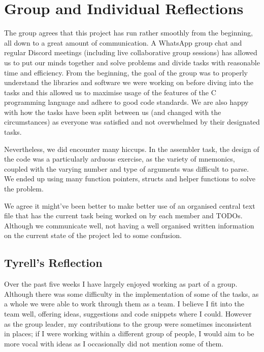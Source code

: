 \documentclass{article}
\begin{document}
\section{Group and Individual Reflections}
The group agrees that this project has run rather smoothly from the beginning, all down to a great amount of communication. A WhatsApp group chat and regular Discord meetings (including live collaborative group sessions) has allowed us to put our minds together and solve problems and divide tasks with reasonable time and efficiency. From the beginning, the goal of the group was to properly understand the libraries and software we were working on before diving into the tasks and this allowed us to maximise usage of the features of the C programming language and adhere to good code standards. We are also happy with how the tasks have been split between us (and changed with the circumstances) as everyone was satisfied and not overwhelmed by their designated tasks.

Nevertheless, we did encounter many hiccups. In the assembler task, the design of the code was a particularly arduous exercise, as the variety of mnemonics, coupled with the varying number and type of arguments was difficult to parse. We ended up using many function pointers, structs and helper functions to solve the problem.

We agree it might've been better to make better use of an organised central text file that has the current task being worked on by each member and TODOs. Although we communicate well, not having a well organised written information on the current state of the project led to some confusion.


\subsection{Tyrell's Reflection}
Over the past five weeks I have largely enjoyed working as part of a group. Although there was some difficulty in the implementation of some of the tasks, as a whole we were able to work through them as a team. I believe I fit into the team well, offering ideas, suggestions and code snippets where I could. However as the group leader, my contributions to the group were sometimes inconsistent in places; if I were working within a different group of people, I would aim to be more vocal with ideas as I occasionally did not mention some of them.
\end{document}
